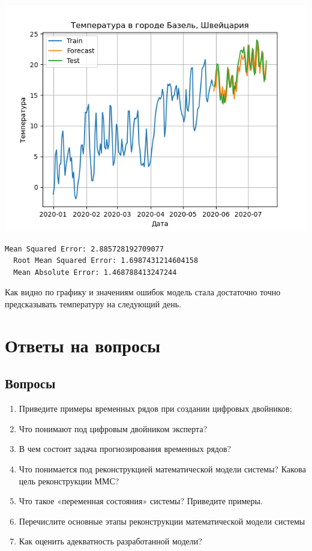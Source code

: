 \documentclass[a4paper, 12pt]{article}
\begin{document}
\begin{center}
  \centering
  \includegraphics[width=.7\linewidth]{extra/rolling_prediction.png}
  \label{fig:prplot}
\end{center}
\begin{lstlisting}[style=text, caption=Отклонения результатов модели с использованием скользящего прогноза]
  Mean Squared Error: 2.885728192709077
  Root Mean Squared Error: 1.6987431214604158
  Mean Absolute Error: 1.468788413247244
\end{lstlisting}
Как видно по графику и значениям ошибок модель стала достаточно точно предсказывать температуру на следующий день.
\newpage
\section{Ответы на вопросы}
\subsection*{Вопросы}
\begin{enumerate}
  \item Приведите примеры временных рядов при создании цифровых двойников;
  \item Что понимают под цифровым двойником эксперта?
  \item В чем состоит задача прогнозирования временных рядов?
  \item Что понимается под реконструкцией математической модели системы? Какова цель реконструкции ММС?
  \item Что такое «переменная состояния» системы? Приведите примеры.
  \item Перечислите основные этапы реконструкции математической модели системы
  \item Как оценить адекватность разработанной модели?
\end{enumerate}
\end{document}
